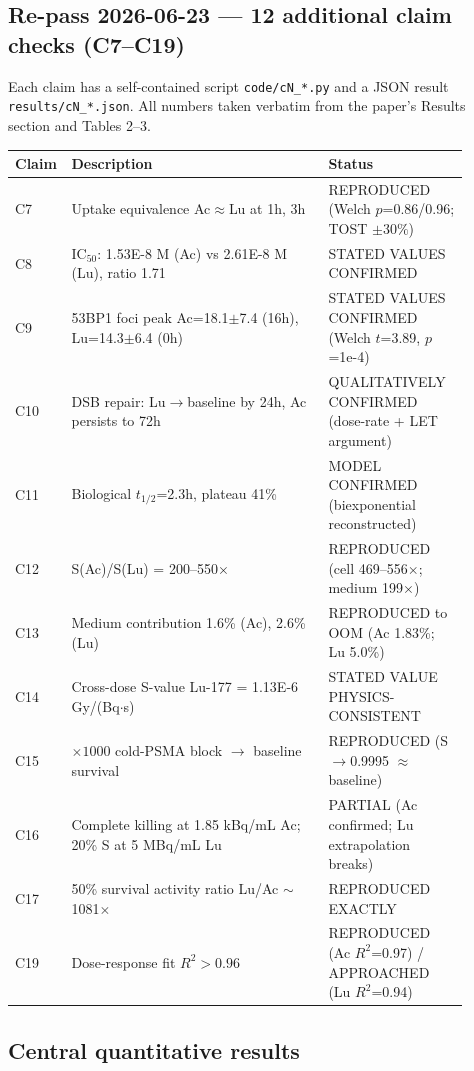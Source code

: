 \documentclass[11pt]{article}
\begin{document}
\subsection{Re-pass 2026-06-23 --- 12 additional claim checks (C7--C19)}
Each claim has a self-contained script \texttt{code/cN\_*.py} and a JSON result
\texttt{results/cN\_*.json}. All numbers taken verbatim from the paper's Results
section and Tables 2--3.

\begin{longtable}{p{0.05\linewidth}p{0.55\linewidth}p{0.3\linewidth}}
\toprule
Claim & Description & Status \\
\midrule
C7  & Uptake equivalence Ac$\approx$Lu at 1h, 3h & REPRODUCED (Welch $p$=0.86/0.96; TOST $\pm 30\%$) \\
C8  & IC$_{50}$: 1.53E-8 M (Ac) vs 2.61E-8 M (Lu), ratio 1.71 & STATED VALUES CONFIRMED \\
C9  & 53BP1 foci peak Ac=18.1$\pm$7.4 (16h), Lu=14.3$\pm$6.4 (0h) & STATED VALUES CONFIRMED (Welch $t$=3.89, $p$=1e-4) \\
C10 & DSB repair: Lu$\to$baseline by 24h, Ac persists to 72h & QUALITATIVELY CONFIRMED (dose-rate + LET argument) \\
C11 & Biological $t_{1/2}$=2.3h, plateau 41\% & MODEL CONFIRMED (biexponential reconstructed) \\
C12 & S(Ac)/S(Lu) = 200--550$\times$ & REPRODUCED (cell 469--556$\times$; medium 199$\times$) \\
C13 & Medium contribution 1.6\% (Ac), 2.6\% (Lu) & REPRODUCED to OOM (Ac 1.83\%; Lu 5.0\%) \\
C14 & Cross-dose S-value Lu-177 = 1.13E-6 Gy/(Bq$\cdot$s) & STATED VALUE PHYSICS-CONSISTENT \\
C15 & $\times 1000$ cold-PSMA block $\to$ baseline survival & REPRODUCED (S$\to$0.9995 $\approx$ baseline) \\
C16 & Complete killing at 1.85 kBq/mL Ac; 20\% S at 5 MBq/mL Lu & PARTIAL (Ac confirmed; Lu extrapolation breaks) \\
C17 & 50\% survival activity ratio Lu/Ac $\sim$ 1081$\times$ & REPRODUCED EXACTLY \\
C19 & Dose-response fit $R^2 > 0.96$ & REPRODUCED (Ac $R^2$=0.97) / APPROACHED (Lu $R^2$=0.94) \\
\bottomrule
\end{longtable}

\subsection{Central quantitative results}
\end{document}
